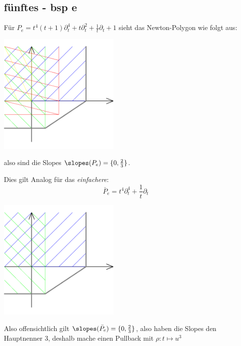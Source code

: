 \subsection{fünftes - bsp e}
Für $ P_e=t^4(t+1)\partial_t^4 + t\partial_t^2+\frac{1}{t}\partial_t+1 $ sieht
das Newton-Polygon wie folgt aus:

\begin{center}
  \includegraphics[width=6cm]{img/e.png}
\end{center}

also sind die Slopes $\slopes(P_e)=\{0,\frac{2}{3}\}$.

Dies gilt Analog für das \emph{einfachere}:
\[ \bar P_e=t^4\partial_t^4 +\frac{1}{t}\partial_t \]

\begin{center}
  \includegraphics[width=6cm]{img/bar_e.png}
\end{center}
Also offensichtlich gilt $\slopes(\bar P_e)=\{0,\frac{2}{3}\}$, also haben die
Slopes den Hauptnenner $3$, deshalb mache einen Pullback mit $\rho:t\mapsto u^3$

